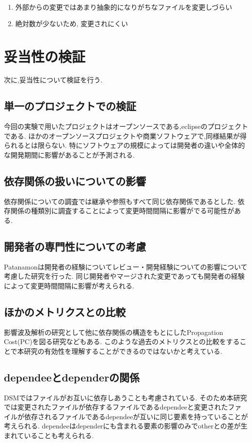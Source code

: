 \documentclass{fose2016}           %
\begin{document}
\begin{enumerate}
\item 外部からの変更ではあまり抽象的になりがちなファイルを変更しづらい
\item 絶対数が少ないため, 変更されにくい
\end{enumerate}

\section{妥当性の検証}\label{妥当性の検証}
次に,妥当性について検証を行う.

\subsection{単一のプロジェクトでの検証}
今回の実験で用いたプロジェクトはオープンソースである,eclipseのプロジェクトである.
ほかのオープンソースプロジェクトや商業ソフトウェアで,同様結果が得られるとは限らない.
特にソフトウェアの規模によっては開発者の違いや全体的な開発期間に影響があることが予測される.

\subsection{依存関係の扱いについての影響}
依存関係についての調査では継承や参照もすべて同じ依存関係であるとした.
依存関係の種類\cite{小谷}別に調査することによって変更時間間隔に影響がでる可能性がある.

\subsection{開発者の専門性についての考慮}
Patanamonは開発者の経験についてレビュー・開発経験についての影響について考慮した研究を行った\cite{Patanamon2}.
同じ開発者やマージされた変更であっても開発者の経験によって変更時間間隔に影響が考えられる.

\subsection{ほかのメトリクスとの比較}
影響波及解析の研究として他に依存関係の構造をもとにしたPropagation Cost(PC)を図る研究などもある.\cite{Nord}
このような過去のメトリクスとの比較をすることで本研究の有効性を理解することができるのではないかと考えている.

\subsection{dependeeとdependerの関係}
DSMではファイルがお互いに依存しあうことも考慮されている.
そのため本研究では変更されたファイルが依存するファイルであるdependeeと変更されたファイルが依存されるファイルであるdependeeが互いに同じ要素を持っていることが考えられる.
dependeeはdependerにも含まれる要素の影響のみでotherとの差が生まれていることも考えられる.
\end{document}
